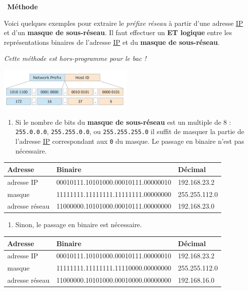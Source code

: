 \documentclass[
  11pt,
]{article}
\newcommand{\passthrough}[1]{#1}
\providecommand{\tightlist}{%
  \setlength{\itemsep}{0pt}\setlength{\parskip}{0pt}}
\newcounter{def}
\newcounter{prog}
\newcounter{logi}
\newenvironment{methode}[1]
{\par \medskip    \noindent  
 \begin {bclogo}[arrondi =0.1,logo=\bcoutil, marge=4,noborder = true] {~\textbf{Méthode}   {\itshape #1} }  \par}
{
\end{bclogo}
 \par \bigskip }
\begin{document}
\begin{methode}{}

Voici quelques exemples pour extraire le \emph{préfixe réseau} à partir
d'une adresse \href{https://fr.wikipedia.org/wiki/Internet_Protocol}{IP}
et d'un \textbf{masque de sous-réseau}. Il faut effectuer un \textbf{ET
logique} entre les représentations binaires de l'adresse
\href{https://fr.wikipedia.org/wiki/Internet_Protocol}{IP} et du
\textbf{masque de sous-réseau}.

\emph{Cette méthode est hors-programme pour le bac !}

\includegraphics[width=0.5\textwidth,height=\textheight]{images/ip-subnet.png}\\

\begin{enumerate}
\def\labelenumi{\arabic{enumi}.}
\tightlist
\item
  Si le nombre de bits du \textbf{masque de sous-réseau} est un multiple
  de 8 : \passthrough{\lstinline!255.0.0.0!},
  \passthrough{\lstinline!255.255.0.0!}, ou
  \passthrough{\lstinline!255.255.255.0!} il suffit de masquer la partie
  de l'adresse
  \href{https://fr.wikipedia.org/wiki/Internet_Protocol}{IP}
  correspondant aux \passthrough{\lstinline!0!} du masque. Le passage en
  binaire n'est pas nécessaire.
\end{enumerate}

\begin{longtable}[]{@{}lll@{}}
\toprule
Adresse & Binaire & Décimal\tabularnewline
\midrule
\endhead
adresse IP & 00010111.10101000.00010111.00000010 &
192.168.23.2\tabularnewline
masque & 11111111.11111111.11111111.00000000 &
255.255.112.0\tabularnewline
adresse réseau & 11000000.10101000.00010111.00000000 &
192.168.23.0\tabularnewline
\bottomrule
\end{longtable}

\begin{enumerate}
\def\labelenumi{\arabic{enumi}.}
\setcounter{enumi}{1}
\tightlist
\item
  Sinon, le passage en binaire est nécessaire.
\end{enumerate}

\begin{longtable}[]{@{}lll@{}}
\toprule
Adresse & Binaire & Décimal\tabularnewline
\midrule
\endhead
adresse IP & 00010111.10101000.00010111.00000010 &
192.168.23.2\tabularnewline
masque & 11111111.11111111.11110000.00000000 &
255.255.112.0\tabularnewline
adresse réseau & 11000000.10101000.00010000.00000000 &
192.168.16.0\tabularnewline
\bottomrule
\end{longtable}


\end{methode}
\end{document}
